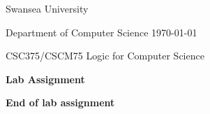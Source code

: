 \documentclass[12pt]{article}
\begin{document}
\thispagestyle{empty}

Swansea University 

Department of Computer Science \hfill  \today

\begin{center}
\Large CSC375/CSCM75 Logic for Computer Science
\end{center}

\begin{center}
{\Large\bf Lab Assignment}
\end{center} 

\bigskip



\bigskip











\bigskip\bigskip

{\bf End of lab assignment}
\end{document}
